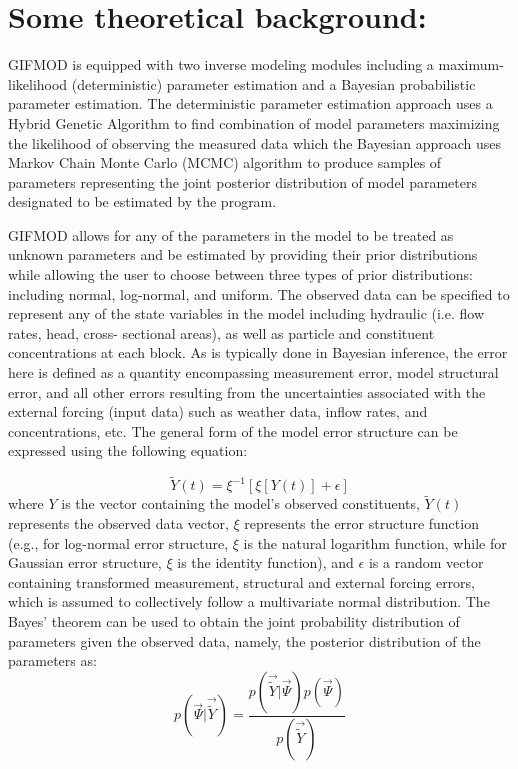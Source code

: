 \section{Some theoretical background: } 

GIFMOD is equipped with two inverse modeling modules including a maximum-likelihood (deterministic) parameter estimation and a Bayesian probabilistic parameter estimation. The deterministic parameter estimation approach uses a Hybrid Genetic Algorithm to find combination of model parameters maximizing the likelihood of observing the measured data which the Bayesian approach uses Markov Chain Monte Carlo (MCMC) algorithm to produce samples of parameters representing the joint posterior distribution of model parameters designated to be estimated by the program. 

GIFMOD allows for any of the parameters in the model to be treated as unknown parameters and be estimated by providing their prior distributions while allowing the user to choose between three types of prior distributions: including normal, log-normal, and uniform. 
The observed data can be specified to represent any of the state variables in the model including hydraulic (i.e.  flow rates, head, cross- sectional areas), as well as particle and constituent concentrations at each block. As is typically done in Bayesian inference, the error here is defined as a quantity encompassing measurement error, model structural error, and all other errors resulting from the uncertainties associated with the external forcing (input data) such as weather data, inflow rates, and concentrations, etc. The general form of the model error structure can be expressed using the following equation: 

\begin{equation}
\label{eq:im1}
\tilde Y(t) = \xi^{-1}[\xi[Y(t)]+\epsilon]
\end{equation}
where $Y$ is the vector containing the model’s observed constituents, $\tilde Y(t)$ represents the observed data vector, $\xi$ represents the error structure function (e.g., for log-normal error structure, $\xi$ is the natural logarithm function, while for Gaussian error structure, $\xi$ is the identity function), and $\epsilon$ is a random vector containing transformed measurement, structural and external forcing errors, which is assumed to collectively follow a multivariate normal distribution. 
The Bayes’ theorem \citep{kaipio2006} can be used to obtain the joint probability distribution of parameters given the observed data, namely, the posterior distribution of the parameters as:
\begin{equation}
\label{eq:im2}
p(\vec{\Psi}|\vec{\tilde Y})=\frac{p(\vec{\tilde Y}|\vec{\Psi}) p(\vec{\Psi})}{p(\vec{\tilde Y})}
\end{equation}


